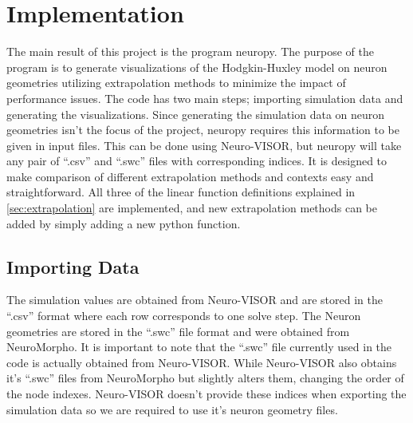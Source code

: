 
\section{Implementation}%
\label{sec:implementation}

The main result of this project is the program neuropy\cite{neuropy}.
The purpose of the program is to generate visualizations of the Hodgkin-Huxley model on neuron geometries utilizing extrapolation methods to minimize the impact of performance issues.
The code has two main steps; importing simulation data and generating the visualizations.
Since generating the simulation data on neuron geometries isn't the focus of the project, neuropy requires this information to be given in input files.
This can be done using Neuro-VISOR, but neuropy will take any pair of ``.csv'' and ``.swc'' files with corresponding indices.
It is designed to make comparison of different extrapolation methods and contexts easy and straightforward. 
All three of the linear function definitions explained in \cref{sec:extrapolation} are implemented, and new extrapolation methods can be added by simply adding a new python function.


\subsection{Importing Data}%
\label{sub:importing_data}
The simulation values are obtained from Neuro-VISOR\cite{neuroVISOR} and are stored in the ``.csv'' format where each row corresponds to one solve step.
The Neuron geometries are stored in the ``.swc'' file format\cite{swc} and were obtained from NeuroMorpho\cite{neuroMorpho}.
It is important to note that the ``.swc'' file currently used in the code is actually obtained from Neuro-VISOR.
While Neuro-VISOR also obtains it's ``.swc'' files from NeuroMorpho but slightly alters them, changing the order of the node indexes\cite{neuropy}.
Neuro-VISOR doesn't provide these indices when exporting the simulation data so we are required to use it's neuron geometry files.

